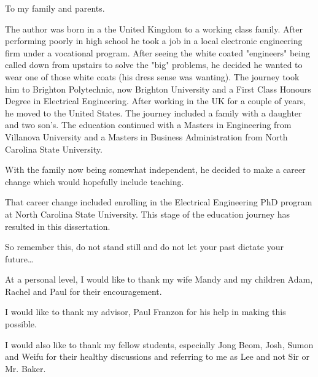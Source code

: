 \maketitlepage

\begin{dedication}
 \centering To my family and parents.
\end{dedication}

\begin{biography}
The author was born in a the United Kingdom to a working class family.  After performing poorly in high school he took a job in a local electronic engineering firm
under a vocational program.
After seeing the white coated "engineers" being called down from upstairs to solve the "big" problems, he decided he wanted to wear one
of those white coats (his dress sense was wanting).
The journey took him to Brighton Polytechnic, now Brighton University and a First Class Honours Degree in Electrical Engineering.
After working in the UK for a couple of years, he moved to the United States.
The journey included a family with a daughter and two son's.
The education continued with a Masters in Engineering from Villanova University and a Masters in Business Administration from North
Carolina State University.

With the family now being somewhat independent, he decided to make a career change which would hopefully include teaching.

That career change included enrolling in the Electrical Engineering PhD program at North
Carolina State University. This stage of the education journey has resulted in this dissertation.

So remember this, do not stand still and do not let your past dictate your future\ldots
\end{biography}

\begin{acknowledgements}
At a personal level, I would like to thank my wife Mandy and my children Adam, Rachel and Paul for their encouragement.

I would like to thank my advisor, Paul Franzon for his help in making this possible.

I would also like to thank my fellow students, especially Jong Beom, Josh, Sumon and Weifu for their healthy discussions and referring to me as Lee and not Sir or Mr. Baker.

\end{acknowledgements}


\iftrue

\thesistableofcontents

\thesislistoftables

\thesislistoffigures

\fi
